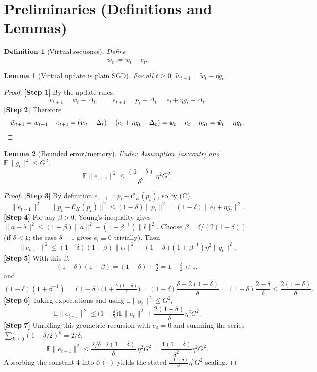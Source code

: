 \documentclass[11pt]{article}
\theoremstyle{plain}
\newtheorem{lemma}{Lemma}
\newtheorem{definition}{Definition}
\begin{document}
\section*{Preliminaries (Definitions and Lemmas)}

\begin{definition}[Virtual sequence]\label{def:virt}
Define
\[
\tilde w_t := w_t - e_t .
\]
\end{definition}

\begin{lemma}[Virtual update is plain SGD]\label{lem:virt}
For all $t\ge0$, $\tilde w_{t+1}=\tilde w_t-\eta g_t$.
\end{lemma}
\begin{proof}
\textbf{[Step 1]} By the update rules,
\[
w_{t+1}=w_t-\Delta_t,\qquad e_{t+1}=p_t-\Delta_t=e_t+\eta g_t-\Delta_t .
\]
\textbf{[Step 2]} Therefore
\[
\tilde w_{t+1}=w_{t+1}-e_{t+1}
=(w_t-\Delta_t)-(e_t+\eta g_t-\Delta_t)
=w_t-e_t-\eta g_t
=\tilde w_t-\eta g_t. \qedhere
\]
\end{proof}

\begin{lemma}[Bounded error/memory]\label{lem:err}
Under Assumption~\ref{as:contr} and $\mathbb{E}\|g_t\|^2\le G^2$,
\[
\mathbb{E}\|e_{t+1}\|^2 \le \frac{(1-\delta)}{\delta^2}\,\eta^2 G^2 .
\]
\end{lemma}
\begin{proof}
\textbf{[Step 3]} By definition $e_{t+1}=p_t-\mathcal{C}_K(p_t)$, so by (C),
\[
\|e_{t+1}\|^2=\|p_t-\mathcal{C}_K(p_t)\|^2\le(1-\delta)\|p_t\|^2=(1-\delta)\|e_t+\eta g_t\|^2 .
\]
\textbf{[Step 4]} For any $\beta>0$, Young's inequality gives
$\|a+b\|^2\le(1+\beta)\|a\|^2+(1+\beta^{-1})\|b\|^2$. Choose $\beta=\delta/(2(1-\delta))$ (if $\delta<1$; the case $\delta=1$ gives $e_t\equiv0$ trivially). Then
\[
\|e_{t+1}\|^2\le(1-\delta)(1+\beta)\|e_t\|^2+(1-\delta)(1+\beta^{-1})\eta^2\|g_t\|^2 .
\]
\textbf{[Step 5]} With this $\beta$,
\[
(1-\delta)(1+\beta)=(1-\delta)+\tfrac{\delta}{2}=1-\tfrac{\delta}{2}<1,
\]
and
\[
(1-\delta)(1+\beta^{-1})=(1-\delta)\Big(1+\tfrac{2(1-\delta)}{\delta}\Big)
=(1-\delta)\frac{\delta+2(1-\delta)}{\delta}
=(1-\delta)\frac{2-\delta}{\delta}\le \frac{2(1-\delta)}{\delta}.
\]
\textbf{[Step 6]} Taking expectations and using $\mathbb{E}\|g_t\|^2\le G^2$,
\[
\mathbb{E}\|e_{t+1}\|^2\le\Big(1-\tfrac{\delta}{2}\Big)\mathbb{E}\|e_t\|^2+\frac{2(1-\delta)}{\delta}\eta^2G^2 .
\]
\textbf{[Step 7]} Unrolling this geometric recursion with $e_0=0$ and summing the series $\sum_{k\ge0}(1-\delta/2)^k=2/\delta$,
\[
\mathbb{E}\|e_{t+1}\|^2\le\frac{2/\delta\cdot 2(1-\delta)}{\delta}\,\eta^2G^2
=\frac{4(1-\delta)}{\delta^2}\eta^2G^2 .
\]
Absorbing the constant $4$ into $\mathcal{O}(\cdot)$ yields the stated $\frac{(1-\delta)}{\delta^2}\eta^2 G^2$ scaling.
\end{proof}
\end{document}
